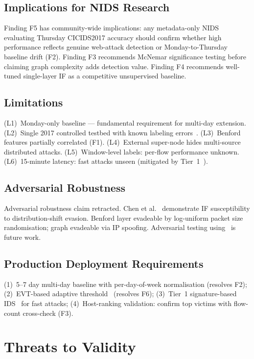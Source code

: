 \documentclass[journal,10pt,twoside]{IEEEtran}
\begin{document}
\subsection{Implications for NIDS Research}
Finding F5 has community-wide implications: any metadata-only NIDS
evaluating Thursday CICIDS2017 accuracy should confirm whether high
performance reflects genuine web-attack detection or
Monday-to-Thursday baseline drift (F2).  Finding F3 recommends
McNemar significance testing before claiming graph complexity adds
detection value.  Finding F4 recommends well-tuned single-layer IF
as a competitive unsupervised baseline.

\subsection{Limitations}
(L1)~Monday-only baseline --- fundamental requirement for multi-day
extension.
(L2)~Single 2017 controlled testbed with known labeling
errors~\cite{lanvin2024errors}.
(L3)~Benford features partially correlated (F1).
(L4)~External super-node hides multi-source distributed attacks.
(L5)~Window-level labels: per-flow performance unknown.
(L6)~15-minute latency: fast attacks unseen (mitigated by
Tier~1~\cite{snort2021}).

\subsection{Adversarial Robustness}
Adversarial robustness claim retracted.
Chen et al.~\cite{chen2023adversarial} demonstrate IF
susceptibility to distribution-shift evasion.  Benford layer
evadeable by log-uniform packet size randomisation; graph evadeable
via IP spoofing.  Adversarial testing
using~\cite{chen2023adversarial,ngo2023adversarial} is future work.

\subsection{Production Deployment Requirements}
(1)~5--7 day multi-day baseline with per-day-of-week normalisation
(resolves F2);
(2)~EVT-based adaptive threshold~\cite{siffer2017evt,zhao2023evt}
(resolves F6);
(3)~Tier~1 signature-based IDS~\cite{snort2021} for fast attacks;
(4)~Host-ranking validation: confirm top victims with flow-count
cross-check (F3).

\section{Threats to Validity}
\label{sec:threats}
\end{document}
